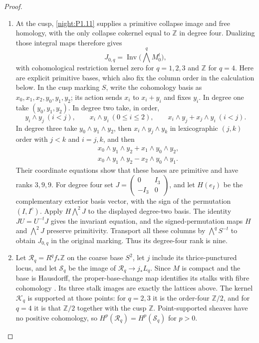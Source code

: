 \begin{proof}
\begin{enumerate}[label=\arabic*.,leftmargin=*]
\item At the cusp, \cref{night:P1.11} supplies a primitive collapse
image and free homology, with the only collapse cokernel equal to
$\mathbb Z$ in degree four.  Dualizing those integral maps therefore
gives
\[
 J_{0,q}=\operatorname{Inv}\bigl(\bigwedge^q M_0^t\bigr),
\]
with cohomological restriction kernel zero for $q=1,2,3$ and
$\mathbb Z$ for $q=4$.
Here are explicit primitive bases, which also fix the column order
in the calculation below.  In the cusp marking $S$, write
the cohomology basis as $x_0,x_1,x_2,y_0,y_1,y_2$; its action sends
$x_i$ to $x_i+y_i$ and fixes $y_i$.
In degree one take $(y_0,y_1,y_2)$.  In degree two take, in order,
\[
 y_i\wedge y_j\ (i<j),\qquad
 x_i\wedge y_i\ (0\le i\le2),\qquad
 x_i\wedge y_j+x_j\wedge y_i\ (i<j).
\]
In degree three take $y_0\wedge y_1\wedge y_2$, then
$x_i\wedge y_j\wedge y_k$ in lexicographic $(j,k)$ order with
$j<k$ and $i=j,k$, and then
\[
\begin{split}
 &x_0\wedge y_1\wedge y_2+x_1\wedge y_0\wedge y_2,\\
 &x_0\wedge y_1\wedge y_2-x_2\wedge y_0\wedge y_1.
\end{split}
\]
Their coordinate equations show that these bases are primitive and
have ranks $3,9,9$.  For degree four set
$J=\left(\begin{smallmatrix}0&I_3\\-I_3&0\end{smallmatrix}\right)$,
and let $H(e_I)$ be the complementary exterior basis vector, with
the sign of the permutation $(I,I^c)$.  Apply
$H\bigwedge^2J$ to the displayed degree-two basis.
The identity $JU=U^{-t}J$ gives the invariant equation, and the
signed-permutation maps $H$ and $\bigwedge^2J$ preserve primitivity.
Transport all these columns by $\bigwedge^qS^{-t}$ to obtain
$J_{0,q}$ in the original marking.  Thus its degree-four rank is nine.

\item Let $\mathcal R_q=R^qf_*\mathbb Z$ on the coarse base $S^2$,
let $j$ include its thrice-punctured locus, and let $\mathcal S_q$
be the image of $\mathcal R_q\to j_*L_q$.
Since $M$ is compact and the base is Hausdorff, the proper-base-change
map identifies its stalks with fibre cohomology
\cite[Tag 09V5, Lemma 20.18.1; chapter PDF p.~30]{StacksProject}.
Its three stalk images are exactly the lattices above.  The kernel
$\mathcal K_q$ is supported at those points: for $q=2,3$ it is the
order-four $\mathbb Z/2$, and for $q=4$ it is that $\mathbb Z/2$
together with the cusp $\mathbb Z$.
Point-supported sheaves have no positive cohomology, so
$H^p(\mathcal R_q)=H^p(\mathcal S_q)$ for $p>0$.


\end{enumerate}
\end{proof}
